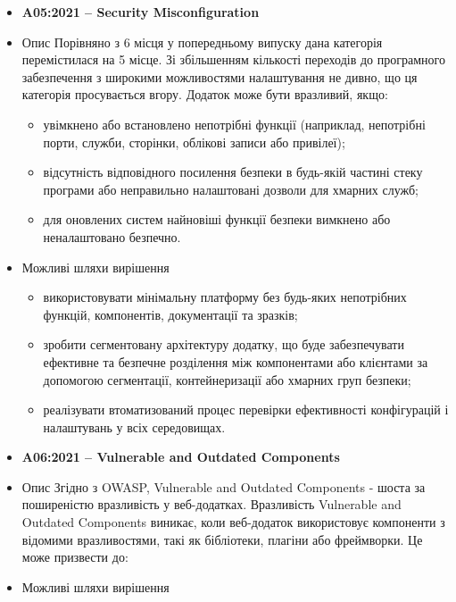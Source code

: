 \begin{itemize}
\begin{itemize}
                \end{itemize}
    \item \textbf{A05:2021 – Security Misconfiguration }
            \item Опис
                Порівняно з 6 місця у попередньому випуску дана категорія перемістилася на 5 місце. Зі збільшенням кількості переходів до програмного забезпечення з широкими можливостями налаштування не дивно, що ця категорія просувається вгору. Додаток може бути вразливий, якщо:
                \begin{itemize}
                    \item увімкнено або встановлено непотрібні функції (наприклад, непотрібні порти, служби, сторінки, облікові записи або привілеї);
                    \item відсутність відповідного посилення безпеки в будь-якій частині стеку програми або неправильно налаштовані дозволи для хмарних служб;
                    \item для оновлених систем найновіші функції безпеки вимкнено або неналаштовано безпечно.
                \end{itemize}
            \item Можливі шляхи вирішення
                \begin{itemize}
                    \item використовувати мінімальну платформу без будь-яких непотрібних функцій, компонентів, документації та зразків;
                    \item зробити сегментовану архітектуру додатку, що буде забезпечувати ефективне та безпечне розділення між компонентами або клієнтами за допомогою сегментації, контейнеризації або хмарних груп безпеки;
                    \item реалізувати втоматизований процес перевірки ефективності конфігурацій і налаштувань у всіх середовищах.
                \end{itemize}
    \item \textbf{A06:2021 – Vulnerable and Outdated Components}
            \item Опис
                Згідно з OWASP, Vulnerable and Outdated Components - шоста за поширеністю вразливість у веб-додатках. Вразливість Vulnerable and Outdated Components виникає, коли веб-додаток використовує компоненти з відомими вразливостями, такі як бібліотеки, плагіни або фреймворки. Це може призвести до:
            \item Можливі шляхи вирішення
                 \begin{itemize}

\end{itemize}
\end{itemize}
